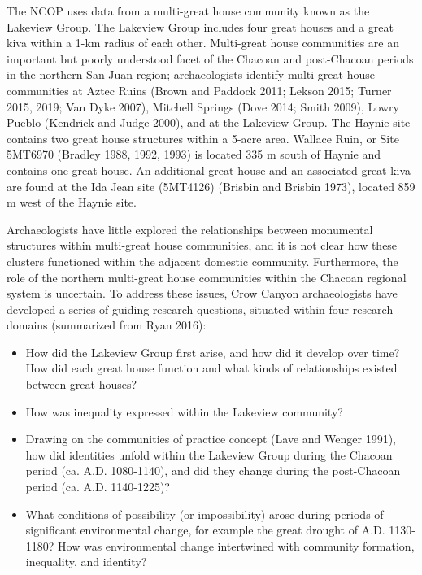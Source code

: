 \documentclass[
  12pt,
]{krantz}
\begin{document}
The NCOP uses data from a multi-great house community known as the
Lakeview Group. The Lakeview Group includes four great houses and a
great kiva within a 1-km radius of each other. Multi-great house
communities are an important but poorly understood facet of the Chacoan
and post-Chacoan periods in the northern San Juan region; archaeologists
identify multi-great house communities at Aztec Ruins (Brown and Paddock
2011; Lekson 2015; Turner 2015, 2019; Van Dyke 2007), Mitchell Springs
(Dove 2014; Smith 2009), Lowry Pueblo (Kendrick and Judge 2000), and at
the Lakeview Group. The Haynie site contains two great house structures
within a 5-acre area. Wallace Ruin, or Site 5MT6970 (Bradley 1988, 1992,
1993) is located 335 m south of Haynie and contains one great house. An
additional great house and an associated great kiva are found at the Ida
Jean site (5MT4126) (Brisbin and Brisbin 1973), located 859 m west of
the Haynie site.

Archaeologists have little explored the relationships between monumental
structures within multi-great house communities, and it is not clear how
these clusters functioned within the adjacent domestic community.
Furthermore, the role of the northern multi-great house communities
within the Chacoan regional system is uncertain. To address these
issues, Crow Canyon archaeologists have developed a series of guiding
research questions, situated within four research domains (summarized
from Ryan 2016):

\begin{itemize}
\item
  How did the Lakeview Group first arise, and how did it develop over
  time? How did each great house function and what kinds of
  relationships existed between great houses?
\item
  How was inequality expressed within the Lakeview community?
\item
  Drawing on the communities of practice concept (Lave and Wenger
  1991), how did identities unfold within the Lakeview Group during
  the Chacoan period (ca. A.D. 1080-1140), and did they change during
  the post-Chacoan period (ca. A.D. 1140-1225)?
\item
  What conditions of possibility (or impossibility) arose during
  periods of significant environmental change, for example the great
  drought of A.D. 1130-1180? How was environmental change intertwined
  with community formation, inequality, and identity?
\end{itemize}
\end{document}
